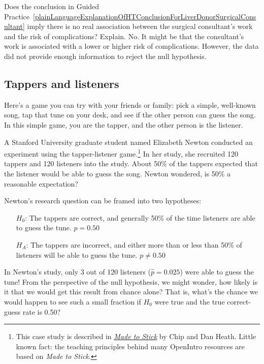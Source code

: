 \begin{example}{Does the conclusion in Guided Practice~\ref{plainLanguageExplanationOfHTConclusionForLiverDonorSurgicalConsultant} imply there is no real association between the surgical consultant's work and the risk of complications? Explain.}
No. It might be that the consultant's work is associated with a lower or higher risk of complications. However, the data did not provide enough information to reject the null hypothesis. %
\end{example}


\subsection{Tappers and listeners}

Here's a game you can try with your friends or family: pick a simple, well-known song, tap that tune on your desk, and see if the other person can guess the song. In this simple game, you are the tapper, and the other person is the listener.

A Stanford University graduate student named Elizabeth Newton conducted an experiment using the tapper-listener game.\footnote{This case study is described in \emph{\href{http://www.openintro.org/redirect.php?go=made-to-stick&redirect=simulation_textbook_pdf_preliminary}{Made to Stick}} by Chip and Dan Heath. Little known fact: the teaching principles behind many OpenIntro resources are based on \emph{Made to Stick}.} In her study, she recruited 120 tappers and 120 listeners into the study. About 50\% of the tappers expected that the listener would be able to guess the song. Newton wondered, is 50\% a reasonable expectation?

Newton's research question can be framed into two hypotheses:
\begin{itemize}
\setlength{\itemsep}{0mm}
\item[$H_0$:] The tappers are correct, and generally 50\% of the time listeners are able to guess the tune. $p = 0.50$
\item[$H_A$:] The tappers are incorrect, and either more than or less than 50\% of listeners will be able to guess the tune. $p \neq 0.50$
\end{itemize}

In Newton's study, only 3 out of 120 listeners ($\hat{p} = 0.025$) were able to guess the tune! From the perspective of the null hypothesis, we might wonder, how likely is it that we would get this result from chance alone? That is, what's the chance we would happen to see such a small fraction if $H_0$ were true and the true correct-guess rate is 0.50?

